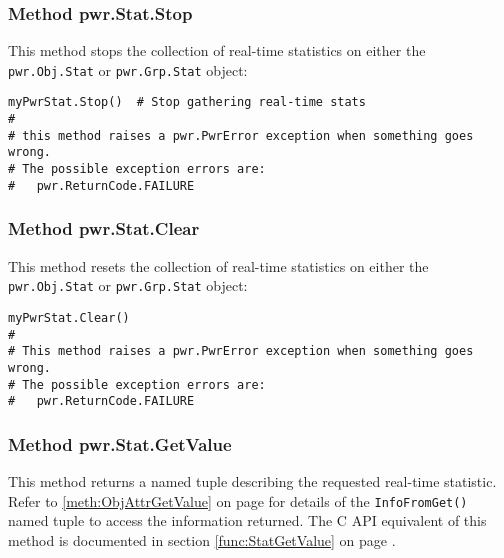 \subsubsection{Method pwr.Stat.Stop} \label{meth:StatStop}

This method stops the collection of real-time statistics on either the
\texttt{pwr.Obj.Stat} or \texttt{pwr.Grp.Stat} object:

\begin{center}\begin{minipage}{.95\linewidth}\begin{lstlisting}
myPwrStat.Stop()  # Stop gathering real-time stats
#
# this method raises a pwr.PwrError exception when something goes wrong.
# The possible exception errors are:
#   pwr.ReturnCode.FAILURE
\end{lstlisting}\end{minipage}\end{center}

\subsubsection{Method pwr.Stat.Clear} \label{meth:StatClear}

This method resets the collection of real-time statistics on either the
\texttt{pwr.Obj.Stat} or \texttt{pwr.Grp.Stat} object:

\begin{center}\begin{minipage}{.95\linewidth}\begin{lstlisting}
myPwrStat.Clear()
#
# This method raises a pwr.PwrError exception when something goes wrong.
# The possible exception errors are:
#   pwr.ReturnCode.FAILURE
\end{lstlisting}\end{minipage}\end{center}

\subsubsection{Method pwr.Stat.GetValue} \label{meth:StatGetValue}

This method returns a named tuple describing the requested real-time statistic. Refer to
\ref{meth:ObjAttrGetValue} on page \pageref{meth:ObjAttrGetValue} for details
of the \texttt{InfoFromGet()} named tuple to access the information returned. The
C API equivalent of this method is documented in section
\ref{func:StatGetValue} on page \pageref{func:StatGetValue}.

